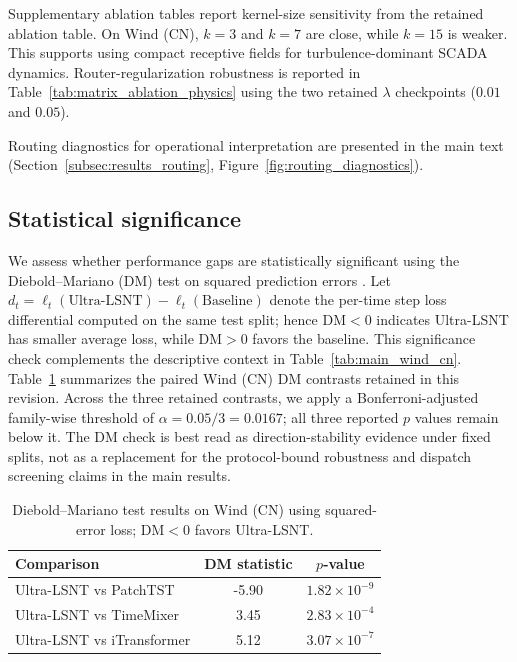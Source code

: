 \documentclass[review,1p,times]{elsarticle}
\begin{document}
Supplementary ablation tables report kernel-size sensitivity from the retained ablation table. On Wind (CN), $k=3$ and $k=7$ are close, while $k=15$ is weaker. This supports using compact receptive fields for turbulence-dominant SCADA dynamics. Router-regularization robustness is reported in Table~\ref{tab:matrix_ablation_physics} using the two retained $\lambda$ checkpoints ($0.01$ and $0.05$).


Routing diagnostics for operational interpretation are presented in the main text (Section~\ref{subsec:results_routing}, Figure~\ref{fig:routing_diagnostics}).


\subsection{Statistical significance}
\label{subsec:results_significance}
We assess whether performance gaps are statistically significant using the Diebold--Mariano (DM) test on squared prediction errors \cite{diebold1995}.
Let $d_t=\ell_t(\text{Ultra-LSNT})-\ell_t(\text{Baseline})$ denote the per-time step loss differential computed on the same test split; hence DM$<0$ indicates Ultra-LSNT has smaller average loss, while DM$>0$ favors the baseline.
This significance check complements the descriptive context in Table~\ref{tab:main_wind_cn}.
Table~\ref{tab:dm_test} summarizes the paired Wind (CN) DM contrasts retained in this revision.
Across the three retained contrasts, we apply a Bonferroni-adjusted family-wise threshold of $\alpha=0.05/3=0.0167$; all three reported $p$ values remain below it. The DM check is best read as direction-stability evidence under fixed splits, not as a replacement for the protocol-bound robustness and dispatch screening claims in the main results.

\begin{table}[t]
\centering
\caption{Diebold--Mariano test results on Wind (CN) using squared-error loss; DM$<0$ favors Ultra-LSNT.}
\label{tab:dm_test}
\begin{tabular}{lcc}
\toprule
Comparison & DM statistic & $p$-value \\
\midrule
Ultra-LSNT vs PatchTST & -5.90 & $1.82 \times 10^{-9}$ \\
Ultra-LSNT vs TimeMixer & 3.45 & $2.83 \times 10^{-4}$ \\
Ultra-LSNT vs iTransformer & 5.12 & $3.07 \times 10^{-7}$ \\
\bottomrule
\end{tabular}
\end{table}
\end{document}
